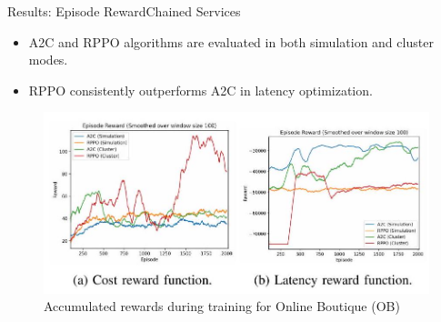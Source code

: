 \documentclass{beamer}
\begin{document}
\begin{frame}{Results: Episode Reward}{Chained Services}
    \begin{itemize}
        \item A2C and RPPO algorithms are evaluated in both simulation and cluster modes.
        \item RPPO consistently outperforms A2C in latency optimization.
    \end{itemize}
    \begin{figure}
        \includegraphics[width=\textwidth]{images/2024_11_17_21ad14b6196e5740bf69g-7(1).jpg} %
        \caption*{Accumulated rewards during training for Online Boutique (OB)}
    \end{figure}
\end{frame}

\end{document}

